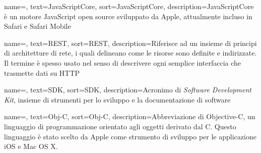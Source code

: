 {
    name=,
    text=JavaScriptCore,
    sort=JavaScriptCore,
    description={JavaScriptCore è un motore JavaScript open source sviluppato da Apple, attualmente incluso in Safari e Safari Mobile}
}

{
    name=,
    text=REST,
    sort=REST,
    description={Riferisce ad un insieme di principi di architetture di rete, i quali delineano come le risorse sono definite e indirizzate. Il termine è spesso usato nel senso di descrivere ogni semplice interfaccia che trasmette dati su HTTP}
}

{
name=,
text=SDK,
sort=SDK,
description={Acronimo di \textit{Software Development Kit}, insieme di strumenti per lo sviluppo e la documentazione di software}
}

{
    name=,
    text=Obj-C,
    sort=Obj-C,
    description={Abbreviazione di Objective-C, un linguaggio di programmazione orientato agli oggetti derivato dal C. Questo linguaggio è stato scelto da Apple come strumento di sviluppo per le applicazione iOS e Mac OS X.}
}
